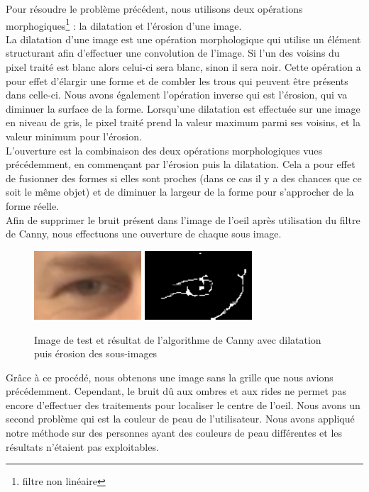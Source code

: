 Pour résoudre le problème précédent, nous utilisons deux opérations morphogiques\footnote{filtre non linéaire} :
la dilatation et l'érosion d'une image.\\

La dilatation d'une image est une opération morphologique qui utilise 
un élément structurant afin d'effectuer une convolution de l'image. Si l'un des voisins du pixel traité
est blanc alors celui-ci sera blanc, sinon il sera noir.
Cette opération a pour effet d'élargir une forme et de combler les trous qui peuvent être présents
dans celle-ci. Nous avons également l'opération inverse qui est l'érosion, qui va diminuer la surface de la forme.
Lorsqu'une dilatation est effectuée sur une image en niveau de gris, le pixel traité prend la valeur maximum parmi
ses voisins, et la valeur minimum pour l'érosion.\\

L'ouverture est la combinaison des deux opérations morphologiques vues précédemment, en commençant par 
l'érosion puis la dilatation. Cela a pour effet de fusionner des formes si elles sont proches (dans ce
cas il y a des chances que ce soit le même objet) et de diminuer la largeur de la forme pour 
s'approcher de la forme réelle.\\ 

Afin de supprimer le bruit présent dans l'image de l'oeil après utilisation du filtre de Canny, nous effectuons une ouverture
de chaque sous image.

\begin{figure}[H]
 \center
 \includegraphics[width=4cm]{image/original.png}
 \includegraphics[width=4cm]{image/canny_final.png}
 \caption{Image de test et résultat de l'algorithme de Canny avec dilatation puis érosion des sous-images}
\end{figure}

Grâce à ce procédé, nous obtenons une image sans la grille que nous avions précédemment. Cependant,
le bruit dû aux ombres et aux rides ne permet pas encore d'effectuer des traitements pour localiser le centre de l'oeil.
Nous avons un second problème qui est la couleur de peau de l'utilisateur. Nous avons appliqué notre méthode 
sur des personnes ayant des couleurs de peau différentes et les résultats n'étaient pas exploitables.

